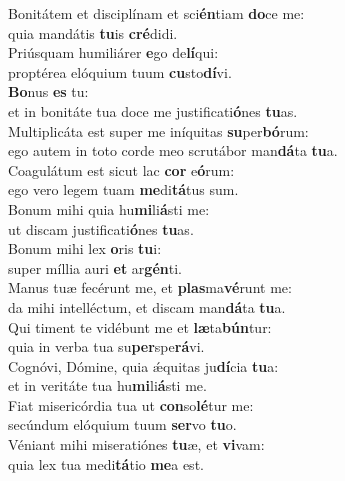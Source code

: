 \evenverse Bonitátem et disciplínam et sci\textbf{én}tiam \textbf{do}ce me:~\*\\
\evenverse quia mandátis \textbf{tu}is \textbf{cré}didi.\\
\oddverse Priúsquam humiliárer \textbf{e}go de\textbf{lí}qui:~\*\\
\oddverse proptérea elóquium tuum \textbf{cu}sto\textbf{dí}vi.\\
\evenverse \textbf{Bo}nus \textbf{es} tu:~\*\\
\evenverse et in bonitáte tua doce me justificati\textbf{ó}nes \textbf{tu}as.\\
\oddverse Multiplicáta est super me iníquitas \textbf{su}per\textbf{bó}rum:~\*\\
\oddverse ego autem in toto corde meo scrutábor man\textbf{dá}ta \textbf{tu}a.\\
\evenverse Coagulátum est sicut lac \textbf{cor} e\textbf{ó}rum:~\*\\
\evenverse ego vero legem tuam \textbf{me}di\textbf{tá}tus sum.\\
\oddverse Bonum mihi quia hu\textbf{mi}li\textbf{á}sti me:~\*\\
\oddverse ut discam justificati\textbf{ó}nes \textbf{tu}as.\\
\evenverse Bonum mihi lex \textbf{o}ris \textbf{tu}i:~\*\\
\evenverse super míllia auri \textbf{et} ar\textbf{gén}ti.\\
\oddverse Manus tuæ fecérunt me, et \textbf{plas}ma\textbf{vé}runt me:~\*\\
\oddverse da mihi intelléctum, et discam man\textbf{dá}ta \textbf{tu}a.\\
\evenverse Qui timent te vidébunt me et \textbf{læ}ta\textbf{bún}tur:~\*\\
\evenverse quia in verba tua su\textbf{per}spe\textbf{rá}vi.\\
\oddverse Cognóvi, Dómine, quia ǽquitas ju\textbf{dí}cia \textbf{tu}a:~\*\\
\oddverse et in veritáte tua hu\textbf{mi}li\textbf{á}sti me.\\
\evenverse Fiat misericórdia tua ut \textbf{con}so\textbf{lé}tur me:~\*\\
\evenverse secúndum elóquium tuum \textbf{ser}vo \textbf{tu}o.\\
\oddverse Véniant mihi miseratiónes \textbf{tu}æ, et \textbf{vi}vam:~\*\\
\oddverse quia lex tua medi\textbf{tá}tio \textbf{me}a est.\\
